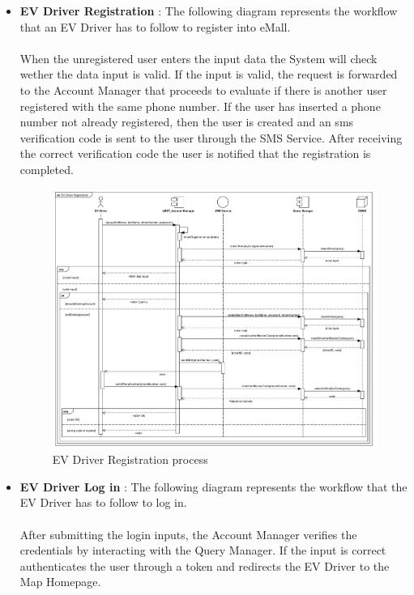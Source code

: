 \begin{itemize}
    \item \textbf{EV Driver Registration} : The following diagram represents the workflow that an EV Driver has to follow to register into eMall.\\
    \\When the unregistered user enters the input data the System will check wether the data input is valid. If the input is valid,
    the request is forwarded to the Account Manager that proceeds to evaluate if there is another user registered with 
    the same phone number. If the user has inserted a phone number not already registered, then the user is created and an sms verification
    code is sent to the user through the SMS Service. After receiving the correct verification code the user is notified that the 
    registration is completed.
    \begin{figure}[H]
        \centering
        \includegraphics[scale=0.55]{src/runtimeVIew/eMSP_Registration.pdf}
        \caption{EV Driver Registration process}
    \end{figure}
    \pagebreak
    \item \textbf{EV Driver Log in} : The following diagram represents the workflow that the EV Driver has to follow to log in.\\
    \\After submitting the login inputs, the Account Manager verifies the credentials by interacting with the Query Manager. If 
    the input is correct authenticates the user through a token and redirects the EV Driver to the Map Homepage.

\end{itemize}
